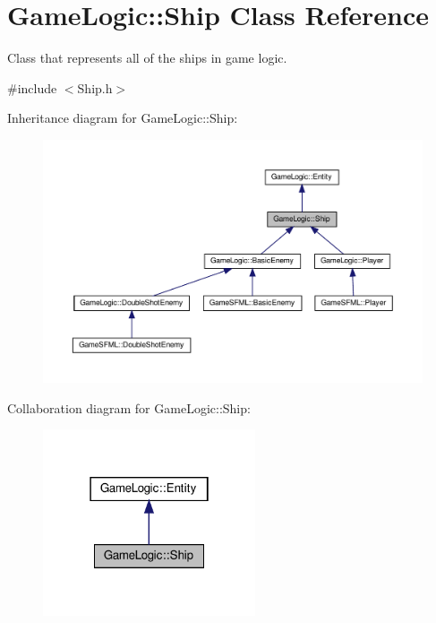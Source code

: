 \hypertarget{classGameLogic_1_1Ship}{}\section{Game\+Logic\+:\+:Ship Class Reference}
\label{classGameLogic_1_1Ship}


Class that represents all of the ships in game logic.  




{\ttfamily \#include $<$Ship.\+h$>$}



Inheritance diagram for Game\+Logic\+:\+:Ship\+:
\nopagebreak
\begin{figure}[H]
\begin{center}
\leavevmode
\includegraphics[width=350pt]{classGameLogic_1_1Ship__inherit__graph}
\end{center}
\end{figure}


Collaboration diagram for Game\+Logic\+:\+:Ship\+:
\nopagebreak
\begin{figure}[H]
\begin{center}
\leavevmode
\includegraphics[width=178pt]{classGameLogic_1_1Ship__coll__graph}
\end{center}
\end{figure}
